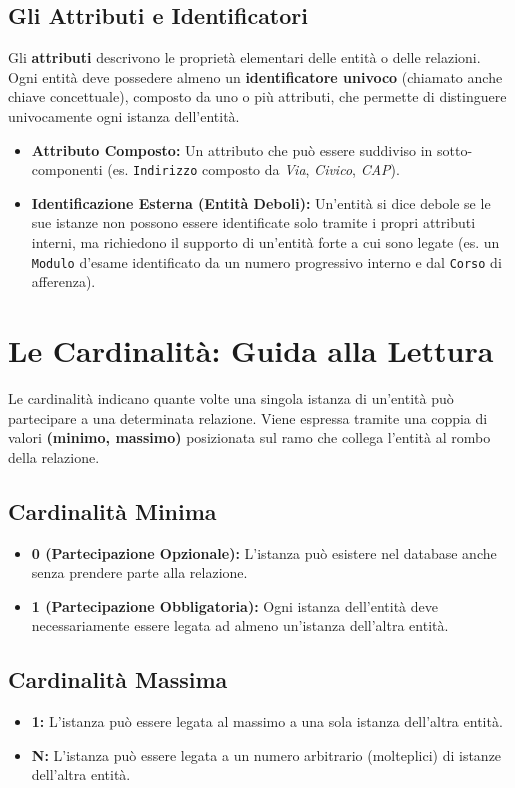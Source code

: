 \subsection{Gli Attributi e Identificatori}
Gli \textbf{attributi} descrivono le proprietà elementari delle entità o delle relazioni. Ogni entità deve possedere almeno un \textbf{identificatore univoco} (chiamato anche chiave concettuale), composto da uno o più attributi, che permette di distinguere univocamente ogni istanza dell'entità.
\begin{itemize}
    \item \textbf{Attributo Composto:} Un attributo che può essere suddiviso in sotto-componenti (es. \texttt{Indirizzo} composto da \textit{Via}, \textit{Civico}, \textit{CAP}).
    \item \textbf{Identificazione Esterna (Entità Deboli):} Un'entità si dice debole se le sue istanze non possono essere identificate solo tramite i propri attributi interni, ma richiedono il supporto di un'entità forte a cui sono legate (es. un \texttt{Modulo} d'esame identificato da un numero progressivo interno e dal \texttt{Corso} di afferenza).
\end{itemize}

\section{Le Cardinalità: Guida alla Lettura}
Le cardinalità indicano quante volte una singola istanza di un'entità può partecipare a una determinata relazione. Viene espressa tramite una coppia di valori \textbf{(minimo, massimo)} posizionata sul ramo che collega l'entità al rombo della relazione.

\subsection{Cardinalità Minima}
\begin{itemize}
    \item \textbf{0 (Partecipazione Opzionale):} L'istanza può esistere nel database anche senza prendere parte alla relazione.
    \item \textbf{1 (Partecipazione Obbligatoria):} Ogni istanza dell'entità deve necessariamente essere legata ad almeno un'istanza dell'altra entità.
\end{itemize}

\subsection{Cardinalità Massima}
\begin{itemize}
    \item \textbf{1:} L'istanza può essere legata al massimo a una sola istanza dell'altra entità.
    \item \textbf{N:} L'istanza può essere legata a un numero arbitrario (molteplici) di istanze dell'altra entità.
\end{itemize}

